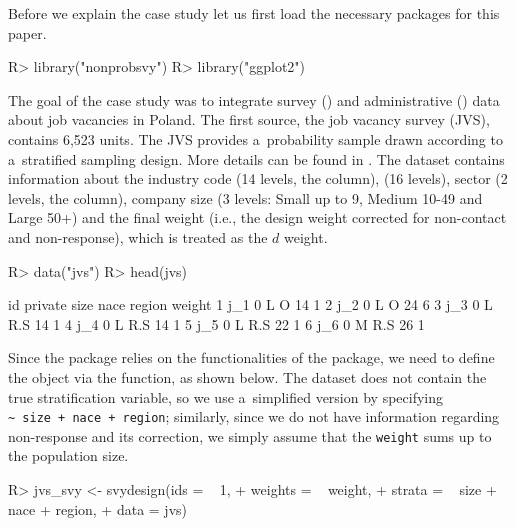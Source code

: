 \documentclass[
]{jss}
\begin{document}
Before we explain the case study let us first load the necessary
packages for this paper.

\begin{CodeChunk}
\begin{CodeInput}
R> library("nonprobsvy")
R> library("ggplot2")  
\end{CodeInput}
\end{CodeChunk}

The goal of the case study was to integrate survey () and
administrative () data about job vacancies in Poland. The
first source, the job vacancy survey (JVS), contains 6,523 units. The
JVS provides a~probability sample drawn according to a~stratified
sampling design. More details can be found in \cite{jvs2022}. The
dataset contains information about the industry code (14 levels, the
 column),  (16 levels), sector (2 levels, the
 column), company size (3 levels: Small up to 9, Medium
10-49 and Large 50+) and the final weight (i.e., the design weight
corrected for non-contact and non-response), which is treated as the
\(d\) weight.

\begin{CodeChunk}
\begin{CodeInput}
R> data("jvs")
R> head(jvs)
\end{CodeInput}
\begin{CodeOutput}
   id private size nace region weight
1 j_1       0    L    O     14      1
2 j_2       0    L    O     24      6
3 j_3       0    L  R.S     14      1
4 j_4       0    L  R.S     14      1
5 j_5       0    L  R.S     22      1
6 j_6       0    M  R.S     26      1
\end{CodeOutput}
\end{CodeChunk}

Since the  package relies on the functionalities of the
 package, we need to define the  object via
the  function, as shown below. The dataset does not
contain the true stratification variable, so we use a~simplified version
by specifying \texttt{\textasciitilde{}\ size\ +\ nace\ +\ region};
similarly, since we do not have information regarding non-response and
its correction, we simply assume that the \texttt{weight} sums up to the
population size.

\begin{CodeChunk}
\begin{CodeInput}
R> jvs_svy <- svydesign(ids = ~ 1, 
+                      weights = ~ weight,
+                      strata = ~ size + nace + region,
+                      data = jvs)
\end{CodeInput}
\end{CodeChunk}
\end{document}

